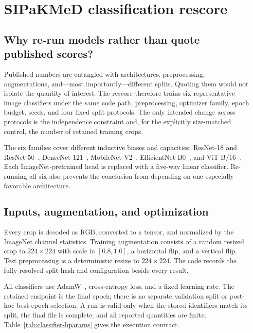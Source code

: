 \documentclass[11pt,oneside]{report}
\begin{document}
\chapter{SIPaKMeD classification rescore}

\section{Why re-run models rather than quote published scores?}

Published numbers are entangled with architectures, preprocessing, augmentations, and---most importantly---different splits. Quoting them would not isolate the quantity of interest. The rescore therefore trains six representative image classifiers under the same code path, preprocessing, optimizer family, epoch budget, seeds, and four fixed split protocols. The only intended change across protocols is the independence constraint and, for the explicitly size-matched control, the number of retained training crops.

The six families cover different inductive biases and capacities: ResNet-18 and ResNet-50~\cite{he2016resnet}, DenseNet-121~\cite{huang2017densenet}, MobileNet-V2~\cite{sandler2018mobilenetv2}, EfficientNet-B0~\cite{tan2019efficientnet}, and ViT-B/16~\cite{dosovitskiy2021vit}. Each ImageNet-pretrained head is replaced with a five-way linear classifier. Re-running all six also prevents the conclusion from depending on one especially favorable architecture.

\section{Inputs, augmentation, and optimization}

Every crop is decoded as RGB, converted to a tensor, and normalized by the ImageNet channel statistics. Training augmentation consists of a random resized crop to $224\times224$ with scale in $[0.8,1.0]$, a horizontal flip, and a vertical flip. Test preprocessing is a deterministic resize to $224\times224$. The code records the fully resolved split hash and configuration beside every result.

All classifiers use AdamW~\cite{loshchilov2019adamw}, cross-entropy loss, and a fixed learning rate. The retained endpoint is the final epoch; there is no separate validation split or post-hoc best-epoch selection. A run is valid only when the stored identifiers match its split, the final file is complete, and all reported quantities are finite. Table~\ref{tab:classifier-hparams} gives the execution contract.
\end{document}
